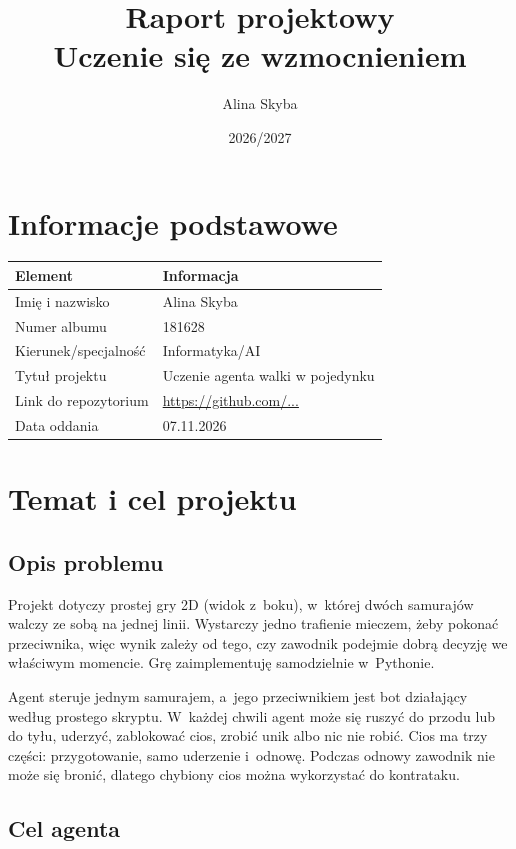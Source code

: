 \documentclass[12pt]{article}
\title{Raport projektowy\\Uczenie się ze wzmocnieniem}
\author{Alina Skyba}
\date{2026/2027}
\begin{document}
\maketitle
\tableofcontents
\newpage

\section{Informacje podstawowe}

\begin{center}
\begin{tabular}{p{}p{}}
\toprule
Element & Informacja \\
\midrule
Imię i nazwisko & Alina Skyba \\
Numer albumu & 181628 \\
Kierunek/specjalność & Informatyka/AI \\
Tytuł projektu & Uczenie agenta walki w pojedynku \\
Link do repozytorium & \url{https://github.com/...} \\
Data oddania & 07.11.2026 \\
\bottomrule
\end{tabular}
\end{center}

\section{Temat i cel projektu}

\subsection{Opis problemu}

Projekt dotyczy prostej gry 2D (widok z~boku), w~której dwóch samurajów walczy ze sobą na jednej linii. Wystarczy jedno trafienie mieczem, żeby pokonać przeciwnika, więc wynik zależy od tego, czy zawodnik podejmie dobrą decyzję we właściwym momencie. Grę zaimplementuję samodzielnie w~Pythonie.

Agent steruje jednym samurajem, a~jego przeciwnikiem jest bot działający według prostego skryptu. W~każdej chwili agent może się ruszyć do przodu lub do tyłu, uderzyć, zablokować cios, zrobić unik albo nic nie robić. Cios ma trzy części: przygotowanie, samo uderzenie i~odnowę. Podczas odnowy zawodnik nie może się bronić, dlatego chybiony cios można wykorzystać do kontrataku.

\subsection{Cel agenta}
\end{document}

